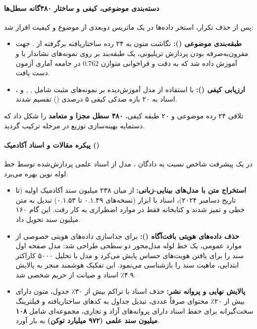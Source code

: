 \paragraph*{دسته‌بندی موضوعی، کیفی و ساختار ۴۸۰‌گانه سطل‌ها}
پس از حذف تکرار، استخر داده‌ها در یک ماتریس دوبعدی از موضوع و کیفیت افراز شد:
\begin{itemize}
    \item \textbf{طبقه‌بندی موضوعی ():} نگاشت متون به ۲۴ رده ساختاریافته برگرفته از  \cite{wettig2025organize}. جهت مقرون‌به‌صرفه بودن پردازش تریلیونی، یک طبقه‌بند  بر روی نمونه‌های نشاندار با  و  آموزش داده شد که به دقت و فراخوانی متوازن $0.762$ در جامعه آماری آزمون دست یافت.
    \item \textbf{ارزیابی کیفی ():} با استفاده از مدل  آموزش‌دیده بر نمونه‌های مثبت شامل  \cite{teknium2023openhermes},  \cite{fan2019eli5},  \cite{ding2023enhancing} و  \cite{zhao2024wildchat}، اسناد به ۲۰ بازه صدکی کیفی ۵ درصدی () تقسیم شدند.
\end{itemize}
تلاقی ۲۴ رده موضوعی و ۲۰ طبقه کیفی، \textbf{۴۸۰ سطل مجزا و متعامد} را شکل داد که دستمایه بهینه‌سازی توزیع در مرحله ترکیب گردید.

\paragraph*{پیکره مقالات و اسناد آکادمیک ()}
در یک پیشرفت شاخص نسبت به دادگان  \cite{soldaini2023pes2o}، مدل  از اسناد علمی پردازش‌شده توسط خط لوله نوین \textbf{} \cite{poznanski2025olmocr} بهره می‌برد:
\begin{itemize}
    \item \textbf{استخراج متن با مدل‌های بینایی-زبانی:} از میان ۲۳۸ میلیون سند  آکادمیک اولیه (تا تاریخ دسامبر ۲۰۲۴)، اسناد با ابزار  (نسخه‌های ۰.۱.۴۹ تا ۰.۱.۵۳) تبدیل به متن خطی و تمیز شدند و کتابخانه  فقط در موارد اضطراری به کار رفت. این گام ۱۶۰ میلیون سند تحویل داد.
    \item \textbf{حذف داده‌های هویتی بافت‌آگاه ():} برای جداسازی داده‌های هویتی خصوصی از موارد عمومی، یک خط لوله مدل‌محور دو سطحی طراحی شد: مدل  صفحه اول سند را برای یافتن هویت‌های حساس پایش می‌کرد و مدل  با تحلیل ۵۰۰۰ کاراکتر ابتدایی، ماهیت سند را بازشناسی می‌نمود. این تفکیک هوشمند منجر به پالایش ۴.۹٪ اسناد و صیانت از حریم شخصی شد.
    \item \textbf{پالایش نهایی و پروانه نشر:} حذف اسناد با تراکم بیش از ۳۰٪ جدول، متون دارای بیش از ۲۰٪ محتوای صرفاً عددی، تبدیل جداول  به کدهای ساختاریافته  و فیلترینگ سخت‌گیرانه برای حفظ اسناد دارای پروانه‌های آزاد و تجاری، مجموعه‌ای شامل \textbf{۱۰۸ میلیون سند علمی (۹۷۲ میلیارد توکن)} به بار آورد.
\end{itemize}

